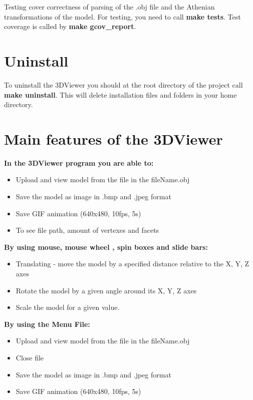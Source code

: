 \documentclass[12pt, a4paper]{article}
\begin{document}
Testing cover correctness of parsing of the .obj file and the Athenian transformations of the model.
For testing, you need to call \textbf{make tests}. Test coverage is called by \textbf{make gcov\_report}.


\section{Uninstall}

To uninstall the 3DViewer you should at the root directory of the project call \textbf{make uninstall}.
This will delete installation files and folders in your home directory.


\vfill

\section{Main features of the 3DViewer}

\textbf{In the 3DViewer program you are able to:}
\begin{itemize}
    \item Upload and view model from the file in the fileName.obj
    \item Save the model as image in .bmp and .jpeg format
    \item Save GIF animation (640x480, 10fps, 5s)
    \item To see file path, amount of vertexes and facets
\end{itemize}

\bigskip

\textbf{By using mouse, mouse wheel , spin boxes and slide bars:}
\begin{itemize}
    \item Translating - move the model by a specified distance relative to the X, Y, Z axes
    \item Rotate the model by a given angle around its X, Y, Z axes
    \item Scale the model for a given value.
\end{itemize}

\bigskip

\textbf{By using the Menu File:}
\begin{itemize}
    \item Upload and view model from the file in the fileName.obj
    \item Close file
    \item Save the model as image in .bmp and .jpeg format
    \item Save GIF animation (640x480, 10fps, 5s)
\end{itemize}
\end{document}
